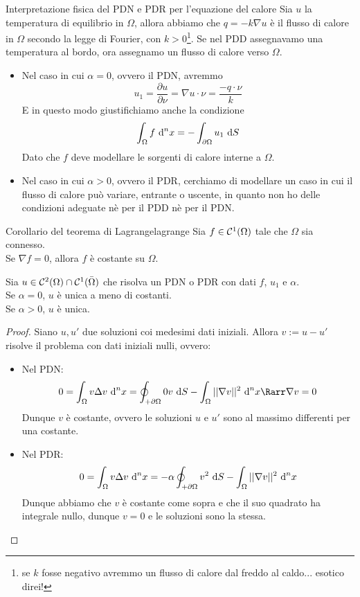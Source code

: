\documentclass{article}
\begin{document}
\begin{remark}{Interpretazione fisica del PDN e PDR per l'equazione del calore}{}
    Sia $u$ la temperatura di equilibrio in $\Omega$, allora abbiamo che  $q = -k\nabla u $ è il flusso di calore in $\Omega$ secondo la legge di Fourier, con $k>0$\footnote{se $k$ fosse negativo avremmo un flusso di calore dal freddo al caldo... esotico direi!}. Se nel PDD assegnavamo una temperatura al bordo, ora assegnamo un flusso di calore verso $\Omega$.\begin{itemize}
        \item Nel caso in cui $\alpha=0$, ovvero il PDN, avremmo \[u_1 = \frac{\partial u}{\partial \nu} = \nabla u \cdot \nu = \frac{-q\cdot \nu}{k}\] E in questo modo giustifichiamo anche la condizione \[\int_\Omega f\text{ d}^n x =-\int_{\partial \Omega} u_1 \text{ d} S\] Dato che $f$ deve modellare le sorgenti di calore interne a $\Omega$.
        \item Nel caso in cui $\alpha > 0$, ovvero il PDR, cerchiamo di modellare un caso in cui il flusso di calore può variare, entrante o uscente, in quanto non ho delle condizioni adeguate nè per il PDD nè per il PDN.
    \end{itemize}
\end{remark}

\begin{lemma}{Corollario del teorema di Lagrange}{lagrange}
    Sia $f\in\mathcal{C}^1(\Omega)$ tale che $\Omega$ sia connesso.\\
    Se $\nabla f = 0$, allora $f$ è costante su $\Omega$.
\end{lemma}

\begin{theorem}
    Sia $u \in \mathcal{C}^2(\Omega)\cap\mathcal{C}^1(\bar{\Omega})$ che risolva un PDN o PDR con dati $f$, $u_1$ e $\alpha$.\\
    Se $\alpha=0$, $u$ è unica a meno di costanti.\\
    Se $\alpha>0$, $u$ è unica.
\end{theorem}

\begin{proof}
    Siano $u,u'$ due soluzioni coi medesimi dati iniziali. Allora $v := u-u'$ risolve il problema con dati iniziali nulli, ovvero:\begin{itemize}
        \item Nel PDN:
        \[0 = \int_\Omega v\Delta v \de^n x = \oint_{+\partial\Omega} 0 v\de S - \int_\Omega ||\nabla v||^2 \de^n x \Rarr \nabla v = 0\] Dunque $v$ è costante, ovvero le soluzioni $u$ e $u'$ sono al massimo differenti per una costante.
        \item Nel PDR:
        \[0 = \int_\Omega v\Delta v \text{ d}^n x = -\alpha \oint_{+\partial\Omega} v^2 \text{ d} S - \int_\Omega ||\nabla v||^2 \text{ d}^n x\] Dunque abbiamo che $v$ è costante come sopra e che il suo quadrato ha integrale nullo, dunque $v=0$ e le soluzioni sono la stessa.
    \end{itemize}
\end{proof}
\end{document}

